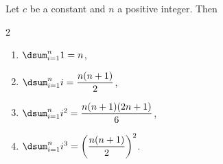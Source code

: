 \documentclass{book}
\begin{document}
\begin{Thm}\label{sum} Let $c$ be a constant and $n$ a positive integer. Then
\begin{multicols}{2}
\begin{enumerate}
\item $\dsum_{i=1}^n 1 = n$,\\

\item $\dsum_{i=1}^n i = \dfrac{n(n+1)}{2}$,\\

\item $\dsum_{i=1}^n i^2 = \dfrac{n(n+1)(2n+1)}{6}$,\\

\item $\dsum_{i=1}^n i^3 = \left(\dfrac{n(n+1)}{2}\right)^2$.
\end{enumerate}
\end{multicols}
\end{Thm}
\end{document}

